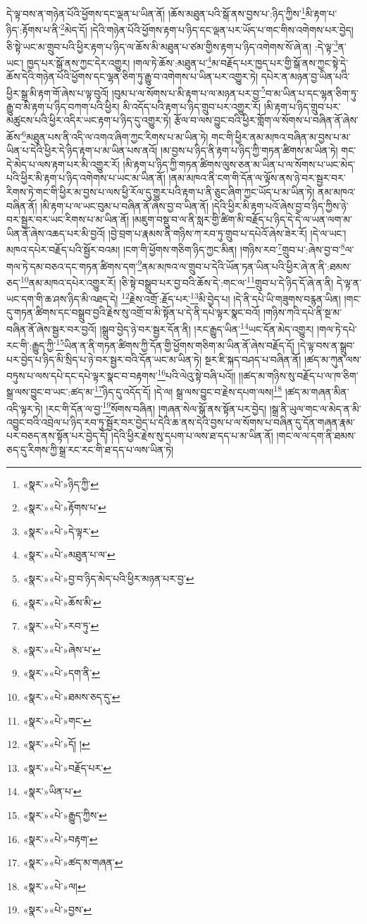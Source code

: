 དེ་ལྟ་བས་ན་གཉེན་པོའི་ཕྱོགས་དང་ལྡན་པ་ཡིན་ནོ། །ཆོས་མཐུན་པའི་སྒོ་ནས་བྱས་པ་:ཉིད་ཀྱིས་\footnote{«སྣར་»«པེ་»ཉིད་ཀྱི་}མི་རྟག་པ་ཉིད་:རྟོགས་པ་ནི་\footnote{«སྣར་»«པེ་»རྟོགས་པ་}མེད་དོ། །དེའི་གཉེན་པོའི་ཕྱོགས་རྟག་པ་ཉིད་དང་ལྡན་པར་ཡོད་པ་གང་གིས་འགེགས་པར་བྱེད། ཅི་སྟེ་ཡང་མ་གྲུབ་པའི་ཕྱིར་རྟག་པ་ཉིད་ལ་ཆོས་མི་མཐུན་པ་ཙམ་གྱིས་རྟག་པ་ཉིད་འགེགས་སོ་ཞེ་ན། :དེ་ལྟ་\footnote{«སྣར་»«པེ་»དེ་ལྟར་}ན་ཡང་། ཁྱད་པར་སྒོ་ནས་ཀྱང་དེར་འགྱུར། །གལ་ཏེ་ཆོས་:མཐུན་པ་\footnote{«སྣར་»«པེ་»མཐུན་པ་ལ་}མ་བརྗོད་པར་ཁྱད་པར་གྱི་སྒོ་ནས་ཀྱང་སྟེ་དེ་ཆོས་དེའི་གཉེན་པོའི་ཕྱོགས་དང་ལྷན་ཅིག་ཏུ་རྒྱུ་བ་འགེགས་པ་ཡིན་པར་འགྱུར་ཏེ། དཔེར་ན་མཉན་བྱ་ཡིན་པའི་ཕྱིར་སྒྲ་མི་རྟག་གོ་ཞེས་པ་ལྟ་བུའོ། །བུམ་པ་ལ་སོགས་པ་མི་རྟག་པ་ལ་མཉན་པར་བྱ་\footnote{«སྣར་»«པེ་»བྱ་བ་ཉིད་མེད་པའི་ཕྱིར་མཉན་པར་བྱ་}བ་མ་ཡིན་པ་དང་ལྷན་ཅིག་ཏུ་རྒྱུ་བ་མི་རྟག་པ་ཉིད་བཀག་པའི་ཕྱིར། མི་འདོད་པའི་རྟག་པ་ཉིད་གྲུབ་པར་འགྱུར་རོ། །མི་རྟག་པ་ཉིད་གྲུབ་པར་མཚུངས་པའི་ཕྱིར་འདིར་ཡང་རྟག་པ་ཉིད་དུ་འགྱུར་ཏེ། རྩོལ་བ་ལས་བྱུང་བའི་ཕྱིར་གློག་ལ་སོགས་པ་བཞིན་ནོ་ཞེས་ཆོས་\footnote{«སྣར་»«པེ་»ཆོས་མི་}མཐུན་པས་ནི་འདི་ལ་འགའ་ཞིག་ཀྱང་རིགས་པ་མ་ཡིན་ཏེ། གང་གི་ཕྱིར་ནམ་མཁའ་བཞིན་མ་བྱས་པ་མ་ཡིན་པ་དེའི་ཕྱིར་དེ་ཉིད་རྟག་པ་མ་ཡིན་པས་ནའོ། །མ་བྱས་པ་ཉིད་ནི་རྟག་པ་ཉིད་ཀྱི་གཏན་ཚིགས་མ་ཡིན་ཏེ། གང་དེ་མེད་པ་ལས་རྟག་པར་མི་འགྱུར་རོ། །མི་རྟག་པ་ཉིད་ཀྱི་གཏན་ཚིགས་ལུས་ཅན་མ་ཡིན་པ་ལ་སོགས་པ་ཡང་མེད་པའི་ཕྱིར་མི་རྟག་པ་ཉིད་འགེགས་པ་ཡང་མ་ཡིན་ནོ། །ནམ་མཁའ་ནི་ངག་གི་དོན་ལ་ལྟོས་ནས་ཉེ་བར་སྦྱར་བར་རིགས་ཏེ་གང་གི་ཕྱིར་མ་བྱས་པ་ལས་ཕྱི་རོལ་དུ་གྱུར་པའི་རྟག་པ་ནི་ཅུང་ཞིག་ཀྱང་ཡོད་པ་མ་ཡིན་ཏེ། ནམ་མཁའ་བཞིན་ནོ། །མི་རྟག་པ་ལ་ཡང་བུམ་པ་བཞིན་ནོ་ཞེས་བྱ་བ་ཡིན་ནོ། །དེའི་ཕྱིར་མི་རྟག་པའོ་ཞེས་བྱ་བ་ཉིད་ཀྱིས་ཉེ་བར་སྦྱར་བར་ཡང་རིགས་པ་མ་ཡིན་ནོ། །མཇུག་བསྡུ་བ་ལ་ནི་སླར་གྱི་ཚིག་མི་བརྗོད་པ་ཉིད་དེ་དེ་ལ་ཡན་ལག་མ་ཡིན་ནོ་ཞེས་འཆད་པར་མི་བྱའོ། །བྱེ་བྲག་པ་རྣམས་ནི་གཉིས་ཀ་རབ་ཏུ་གྲུབ་པ་དཔེའོ་ཞེས་ཟེར་རོ། །དེ་ལ་ཡང་། མཁའ་དཔེར་བརྗོད་པའི་སྦྱོར་བའམ། །ངག་གི་ཕྱོགས་གཅིག་ཉིད་ཀྱང་མིན། །གཉིས་རབ་\footnote{«སྣར་»«པེ་»རབ་ཏུ་}གྲུབ་པ་:ཞེས་བྱ་བ་\footnote{«སྣར་»«པེ་»ཞེས་པ་}ལ་གལ་ཏེ་དམ་བཅའ་དང་གཏན་ཚིགས་དག་\footnote{«སྣར་»«པེ་»དག་ནི་}ནམ་མཁའ་ལ་གྲུབ་པ་དེའི་ཡོན་ཏན་ཡིན་པའི་ཕྱིར་ཞེ་ན་ནི་:ཐམས་ཅད་\footnote{«སྣར་»«པེ་»ཐམས་ཅད་དུ་}ནམ་མཁའ་དཔེར་འགྱུར་རོ། །ཅི་སྟེ་བསྒྲུབ་པར་བྱ་བའི་ཆོས་དེ་:གང་ལ་\footnote{«སྣར་»«པེ་»གང་}གྲུབ་པ་དེ་ཉིད་དོ་ཞེ་ན་ནི། དེ་ལྟ་ན་ཡང་དག་གི་ཆ་ཤས་ཉིད་མི་འཐད་དེ། \footnote{«སྣར་»«པེ་»དོ། ། }རྗེས་འགྲོ་:རྗོད་པར་\footnote{«སྣར་»«པེ་»བརྗོད་པར་}མི་བྱེད་པ། །དེ་ནི་དཔེ་ཡི་གཟུགས་བརྙན་ཡིན། །གང་དུ་གཏན་ཚིགས་དང་བསྒྲུབ་བྱའི་རྗེས་སུ་འགྲོ་བ་མི་སྟོན་པ་དེ་ནི་དཔེ་ལྟར་སྣང་བའོ། །གཉིས་ཀའི་དཔེ་ནི་སྔ་མ་བཞིན་ནོ་ཞེས་སྦྱར་བར་བྱའོ། །སྒྲུབ་བྱེད་ཉེ་བར་སྦྱར་དོན་ནི། །རང་རྒྱུད་ཡིན་\footnote{«སྣར་»ཡིན་པ་}ཡང་དོན་མེད་འགྱུར། །གལ་ཏེ་དཔེ་རང་གི་:རྒྱུད་ཀྱི་\footnote{«སྣར་»«པེ་»རྒྱུད་ཀྱིས་}ཡིན་ན་ནི་གཏན་ཚིགས་ཀྱི་དོན་གྱི་ཕྱོགས་གཅིག་མ་ཡིན་ནོ་ཞེས་བརྗོད་དོ། །དེ་ལྟ་བས་ན་སྒྲུབ་པར་བྱེད་པ་ཉིད་མི་སྲིད་པ་ཉེ་བར་སྦྱར་བའི་དོན་ཡང་མ་ཡིན་ཏེ། སྔར་ཇི་སྐད་བཤད་པ་བཞིན་ནོ། །ཚད་མ་ཀུན་ལས་བཏུས་པ་ལས་དཔེ་དང་དཔེ་ལྟར་སྣང་བ་བརྟགས་\footnote{«སྣར་»«པེ་»བརྟག་}པའི་ལེའུ་སྟེ་བཞི་པའོ།། །།ཚད་མ་གཉིས་སུ་བརྗོད་པ་ལ་ཁ་ཅིག་སྒྲ་ལས་བྱུང་བ་ཡང་:ཚད་མ་\footnote{«སྣར་»«པེ་»ཚད་མ་གཞན་}ཉིད་དུ་འདོད་དོ། །དེ་ལ། སྒྲ་ལས་བྱུང་བ་རྗེས་དཔག་ལས།\footnote{«སྣར་»«པེ་»ལ།} །ཚད་མ་གཞན་མིན་འདི་ལྟར་ཏེ། །རང་གི་དོན་ལ་བྱ་\footnote{«སྣར་»«པེ་»བྱས་}སོགས་བཞིན། །གཞན་སེལ་སྒོ་ནས་སྟོན་པར་བྱེད། །སྒྲ་ནི་ཡུལ་གང་ལ་མེད་ན་མི་འབྱུང་བའི་འབྲེལ་པ་ཉིད་རབ་ཏུ་སྦྱོར་བར་བྱེད་པ་དེའི་ཆ་ནས་དེའི་བྱས་པ་ལ་སོགས་པ་བཞིན་དུ་དོན་གཞན་རྣམ་པར་བཅད་ནས་སྟོན་པར་བྱེད་དོ། །དེའི་ཕྱིར་རྗེས་སུ་དཔག་པ་ལས་ཐ་དད་པ་མ་ཡིན་ནོ། །གང་ལ་ལ་དག་ནི་ཐམས་ཅད་དུ་རིགས་ཀྱི་སྒྲ་རང་རང་གི་ཐ་དད་པ་ལས་ཡིན་ཏེ། 
